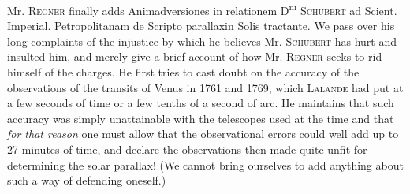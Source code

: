 Mr. \textsc{Regner} finally adds Animadversiones in relationem D\textsuperscript{nı} \textsc{Schubert} ad Scient. Imperial. Petropolitanam de Scripto parallaxin Solis tractante. We pass over his long complaints of the injustice by which he believes Mr. \textsc{Schubert} has hurt and insulted him, and merely give a brief account of how Mr. \textsc{Regner} seeks to rid himself of the charges. He first tries to cast doubt on the accuracy of the observations of the transits of Venus in 1761 and 1769, which \textsc{Lalande} had put at a few seconds of time or a few tenths of a second of arc. He maintains that such accuracy was simply unattainable with the telescopes used at the time and that \emph{for that reason} one must allow that the observational errors could well add up to 27 minutes of time, and declare the observations then made quite unfit for determining the solar parallax! (We cannot bring ourselves to add anything about such a way of defending oneself.)

